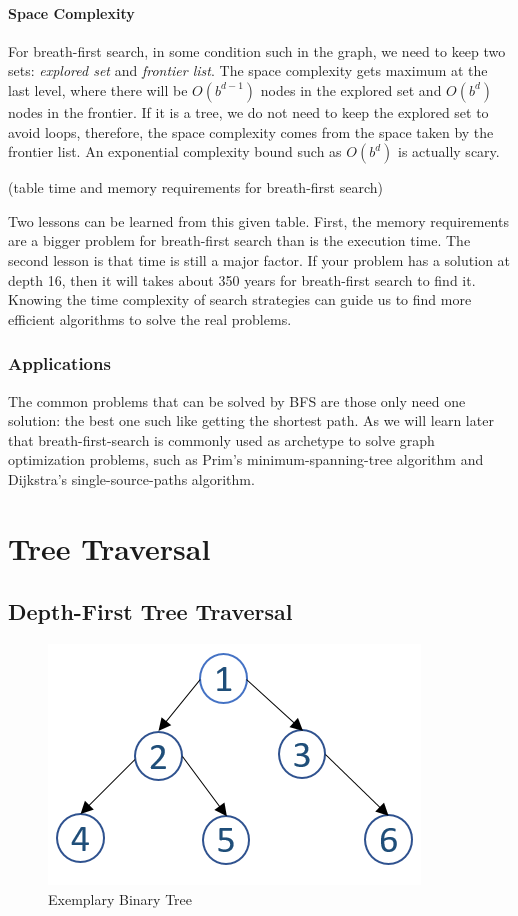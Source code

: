 \documentclass[main.tex]{subfiles}
\begin{document}
\paragraph{Space Complexity} For breath-first search, in some condition such in the graph, we need to keep two sets: \textit{explored set} and \textit{frontier list}. The space complexity gets maximum at the last level, where there will be $O(b^{d-1})$ nodes in the explored set and $O(b^d)$ nodes in the frontier. If it is a tree, we do not need to keep the explored set to avoid loops, therefore,  the space complexity comes from the space taken by the frontier list. An exponential complexity bound such as $O(b^d)$ is actually scary. 

(table time and memory requirements for breath-first search)

Two lessons can be learned from this given table. First, the memory requirements are a bigger problem for breath-first search than is the execution time. The second lesson is that time is still a major factor. If your problem has a solution at depth 16, then it will takes about 350 years for breath-first search to find it. Knowing the time complexity of search strategies can guide us to find more efficient algorithms to solve the real problems. 

 \subsubsection{Applications} The common problems that can be solved by BFS are those only need one solution: the best one such like getting the shortest path. As  we will learn later that breath-first-search is commonly used as archetype to solve graph optimization problems, such as Prim's minimum-spanning-tree algorithm and Dijkstra's single-source-paths algorithm.

\section{Tree Traversal}
\subsection{Depth-First Tree Traversal}
\begin{figure}[H]
    \centering
    \includegraphics[width = .45\columnwidth]{fig/binary_tree_example.png}
    \caption{Exemplary Binary Tree }
    \label{fig:binary_tree_traversal_example}
\end{figure}
\end{document}
